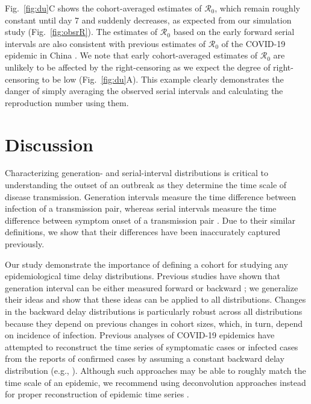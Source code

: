 \documentclass[12pt]{article}
\newcommand{\fref}[1]{Fig.~\ref{fig:#1}}
\newcommand{\Rx}[1]{\ensuremath{{\mathcal R}_{#1}}\xspace}
\newcommand{\Ro}{\Rx{0}}
\begin{document}
\fref{du}C shows the cohort-averaged estimates of \Ro, which remain roughly constant until day 7 and suddenly decreases, as expected from our simulation study (\fref{obsrR}).
The estimates of \Ro based on the early forward serial intervals are also consistent with previous estimates of \Ro of the COVID-19 epidemic in China \citep{majumder2020early, park2020reconciling}.
We note that early cohort-averaged estimates of \Ro are unlikely to be affected by the right-censoring as we expect the degree of right-censoring to be low (\fref{du}A).
This example clearly demonstrates the danger of simply averaging the observed serial intervals and calculating the reproduction number using them.

\section{Discussion}

Characterizing generation- and serial-interval distributions is critical to understanding the outset of an outbreak as they determine the time scale of disease transmission.
Generation intervals measure the time difference between infection of a transmission pair, whereas serial intervals measure the time difference between symptom onset of a transmission pair \citep{svensson2007note}.
Due to their similar definitions, we show that their differences have been inaccurately captured previously.

Our study demonstrate the importance of defining a cohort for studying any epidemiological time delay distributions.
Previous studies have shown that generation interval can be either measured forward or backward \citep{champredon2015intrinsic};
we generalize their ideas and show that these ideas can be applied to all distributions.
Changes in the backward delay distributions is particularly robust across all distributions because they depend on previous changes in cohort sizes, which, in turn, depend on incidence of infection.
Previous analyses of COVID-19 epidemics have attempted to reconstruct the time series of symptomatic cases or infected cases from the reports of confirmed cases by assuming a constant backward delay distribution (e.g., \cite{tempvar, park2020potential, shim2020transmission}).
Although such approaches may be able to roughly match the time scale of an epidemic, we recommend using deconvolution approaches instead for proper reconstruction of epidemic time series \citep{goldstein2009reconstructing}.
\end{document}

